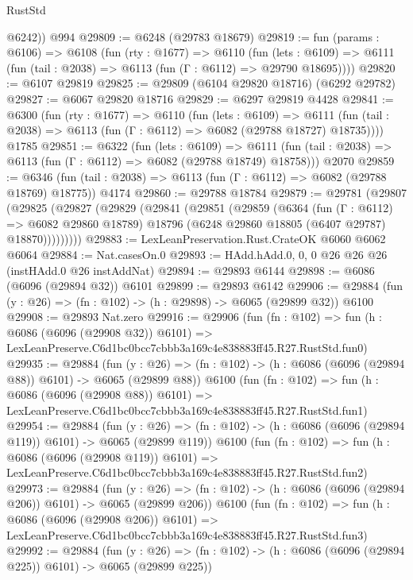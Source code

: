 \begin{lexlean}{RustStd}
\begin{coremodule}
        @6242))
    @994
@29809 := @6248 (@29783 @18679)
@29819 := fun (params : @6106) =>
  @6108
    (fun (rty : @1677) =>
    @6110
      (fun (lets : @6109) =>
      @6111 (fun (tail : @2038) => @6113 (fun (Γ : @6112) => @29790 @18695))))
@29820 := @6107 @29819
@29825 := @29809 (@6104 @29820 @18716) (@6292 @29782)
@29827 := @6067 @29820 @18716
@29829 := @6297 @29819 @4428
@29841 := @6300
    (fun (rty : @1677) =>
    @6110
      (fun (lets : @6109) =>
      @6111 (fun (tail : @2038) => @6113 (fun (Γ : @6112) => @6082 (@29788 @18727) @18735))))
    @1785
@29851 := @6322
    (fun (lets : @6109) =>
    @6111 (fun (tail : @2038) => @6113 (fun (Γ : @6112) => @6082 (@29788 @18749) @18758)))
    @2070
@29859 := @6346
    (fun (tail : @2038) => @6113 (fun (Γ : @6112) => @6082 (@29788 @18769) @18775))
    @4174
@29860 := @29788 @18784
@29879 := @29781
    (@29807
      (@29825
        (@29827
          (@29829
            (@29841
              (@29851
                (@29859
                  (@6364
                    (fun (Γ : @6112) => @6082 @29860 @18789)
                    @18796
                    (@6248 @29860 @18805 (@6407 @29787) @18870)))))))))
@29883 := LexLeanPreservation.Rust.CrateOK @6060 @6062 @6064
@29884 := Nat.casesOn.{0}
@29893 := HAdd.hAdd.{0, 0, 0} @26 @26 @26 (instHAdd.{0} @26 instAddNat)
@29894 := @29893 @6144
@29898 := @6086 (@6096 (@29894 @32)) @6101
@29899 := @29893 @6142
@29906 := @29884 (fun (y : @26) => (fn : @102) -> (h : @29898) -> @6065 (@29899 @32)) @6100
@29908 := @29893 Nat.zero
@29916 := @29906
    (fun (fn : @102) =>
    fun (h : @6086 (@6096 (@29908 @32)) @6101) =>
    LexLeanPreserve.C6d1bc0bcc7cbbb3a169c4e838883ff45.R27.RustStd.fun0)
@29935 := @29884
    (fun (y : @26) => (fn : @102) -> (h : @6086 (@6096 (@29894 @88)) @6101) -> @6065 (@29899 @88))
    @6100
    (fun (fn : @102) =>
    fun (h : @6086 (@6096 (@29908 @88)) @6101) =>
    LexLeanPreserve.C6d1bc0bcc7cbbb3a169c4e838883ff45.R27.RustStd.fun1)
@29954 := @29884
    (fun (y : @26) => (fn : @102) -> (h : @6086 (@6096 (@29894 @119)) @6101) -> @6065 (@29899 @119))
    @6100
    (fun (fn : @102) =>
    fun (h : @6086 (@6096 (@29908 @119)) @6101) =>
    LexLeanPreserve.C6d1bc0bcc7cbbb3a169c4e838883ff45.R27.RustStd.fun2)
@29973 := @29884
    (fun (y : @26) => (fn : @102) -> (h : @6086 (@6096 (@29894 @206)) @6101) -> @6065 (@29899 @206))
    @6100
    (fun (fn : @102) =>
    fun (h : @6086 (@6096 (@29908 @206)) @6101) =>
    LexLeanPreserve.C6d1bc0bcc7cbbb3a169c4e838883ff45.R27.RustStd.fun3)
@29992 := @29884
    (fun (y : @26) => (fn : @102) -> (h : @6086 (@6096 (@29894 @225)) @6101) -> @6065 (@29899 @225))

\end{coremodule}
\end{lexlean}
